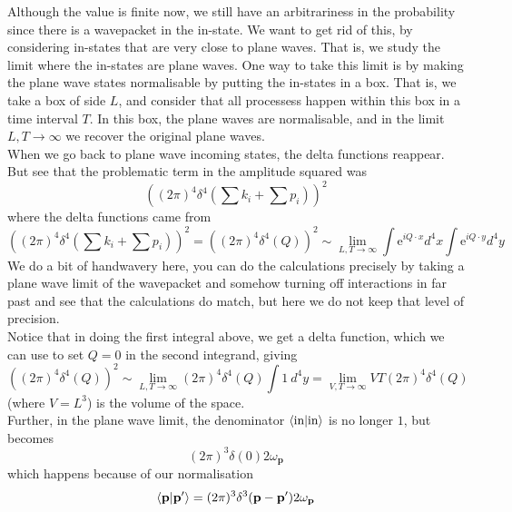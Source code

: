 \documentclass[11pt]{article}
\newcommand{\e}{\mathrm{e}}
\newcommand{\w}{\omega}
\numberwithin{equation}{section}
\begin{document}
    Although the value is finite now, we still have an arbitrariness in the probability since there is a wavepacket in the in-state. We want to get rid of this, by considering in-states that are very close to plane waves. That is, we study the limit where the in-states are plane waves. One way to take this limit is by making the plane wave states normalisable by putting the in-states in a box. That is, we take a box of side \(L\), and consider that all processess happen within this box in a time interval \(T\). In this box, the plane waves are normalisable, and in the limit \(L,T\to\infty\) we recover the original plane waves. \\

    When we go back to plane wave incoming states, the delta functions reappear. But see that the problematic term in the amplitude squared was 
    \begin{equation*}
        \left((2\pi)^4 \delta^4(\sum k_i + \sum p_i)\right)^2 
    \end{equation*}
    where the delta functions came from 
    \begin{equation*}
        \left((2\pi)^4 \delta^4(\sum k_i + \sum p_i)\right)^2 = \left((2\pi)^4 \delta^4(Q)\right)^2\sim  \lim_{L,T\to \infty}\int \e^{iQ\cdot x} d^4x \int \e^{iQ\cdot y}d^4y
    \end{equation*}
    We do a bit of handwavery here, you can do the calculations precisely by taking a plane wave limit of the wavepacket and somehow turning off interactions in far past and see that the calculations do match, but here we do not keep that level of precision. \\
    Notice that in doing the first integral above, we get a delta function, which we can use to set \(Q=0\) in the second integrand, giving
    \begin{equation*}
        \left((2\pi)^4 \delta^4(Q)\right)^2\sim  \lim_{L,T\to \infty}(2\pi)^4 \delta^4(Q) \int 1~d^4y = \lim_{V,T\to \infty}VT (2\pi)^4 \delta^4(Q) 
    \end{equation*}
    (where \(V=L^3\)) is the volume of the space.\\
    Further, in the plane wave limit, the denominator \(\braket{\text{in}|\text{in}}\) is no longer \(1\), but becomes 
    \begin{equation*}
        (2\pi)^3\delta(0)2\w_\textbf{p}
    \end{equation*}
    which happens because of our normalisation 
    \begin{equation*}
        \braket{\textbf{p}|\textbf{p}'} = (2\pi)^3 \delta^3(\textbf{p} - \textbf{p}')2\w_\textbf{p}
    \end{equation*}
\end{document}

